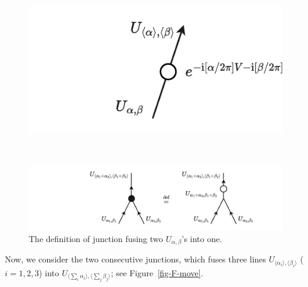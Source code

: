 \documentclass[11pt,toc=bibliography]{scrbook}
\numberwithin{equation}{section}
\begin{document}
\begin{figure}[t]

\begin{minipage}{0.35\linewidth}
\begin{center}
\includegraphics{figures/prod_isom.pdf}
\end{center}
\end{minipage}%
%
\begin{minipage}{0.05\linewidth}
~\end{minipage}%
%
\begin{minipage}{0.60\linewidth}
\begin{center}
\includegraphics{figures/junction_def.pdf}
\end{center}
\end{minipage}%

\caption{\label{fig-junction-def}The definition of junction fusing two
\(U_{\alpha,\beta}\)'s into one.}

\end{figure}%

Now, we consider the two consecutive junctions, which fuses three lines
\(U_{\langle\alpha_i\rangle,\langle\beta_i\rangle}\) (\(i=1,2,3\)) into
\(U_{\langle\sum_i \alpha_i\rangle,\langle\sum_j \beta_j \rangle}\); see
Figure~\ref{fig-F-move}.
\end{document}
